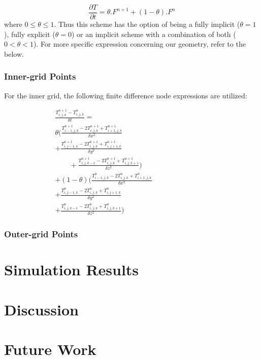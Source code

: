 \documentclass[a4paper,10pt]{IEEEtran}
\begin{document}
	\begin{equation}
	\frac{\partial T}{\partial t} = \theta.F^{n+1} + (1-\theta).F^{n}
	\end{equation}
	where $0 \le \theta \le 1$. Thus this scheme has the option of being a fully implicit ($\theta = 1$), fully explicit ($\theta = 0$) or an implicit scheme with a combination of both ($0 < \theta < 1$). For more specific expression concerning our geometry, refer to the below.
	 
	\subsubsection{Inner-grid Points}
	For the inner grid, the following finite difference node expressions are utilized:
	
	\begin{multline}
	\frac{T_{i,j,k}^{n+1} - T_{i,j,k}^n}{\delta t} = \\
	\theta \bigg(  \frac{T_{i-1,j,k}^{n+1}-2T_{i,j,k}^{n+1}+T_{i+1,j,k}^{n+1}}{\delta x^2} \qquad \qquad \\
	+ \frac{T_{i,j-1,k}^{n+1}-2T_{i,j,k}^{n+1}+T_{i,j+1,k}^{n+1}}{\delta y^2} \qquad \\
	\qquad + \frac{T_{i,j,k-1}^{n+1}-2T_{i,j,k}^{n+1}+T_{i,j,k+1}^{n+1}}{\delta z^2} \bigg) \\
	+ (1 - \theta) \bigg(
	\frac{T_{i-1,j,k}^{n}-2T_{i,j,k}^{n}+T_{i+1,j,k}^{n}}{\delta x^2} \qquad \qquad \qquad \qquad \\
	+ \frac{T_{i,j-1,k}^{n}-2T_{i,j,k}^{n}+T_{i,j+1,k}^{n}}{\delta y^2} \\
	+ \frac{T_{i,j,k-1}^{n}-2T_{i,j,k}^{n}+T_{i,j,k+1}^{n}}{\delta z^2} \bigg)
	\end{multline}
	\subsubsection{Outer-grid Points}
	
	\section{Simulation Results}
	
	\section{Discussion}
	\section{Future Work}
	
	
	\begin{thebibliography}{1}
		
	\end{thebibliography}
\end{document}
